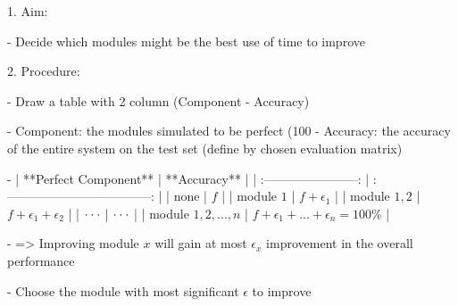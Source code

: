 1. Aim:

- Decide which modules might be the best use of time to improve

2. Procedure:

- Draw a table with 2 column (Component - Accuracy)

- Component: the modules simulated to be perfect (100%
- Accuracy: the accuracy of the entire system on the test set (define by chosen evaluation matrix)

- |   **Perfect Component**   |             **Accuracy**              |
| :-----------------------: | :-----------------------------------: |
|           none            |                  $f$                  |
|        module $1$         |            $f+\epsilon_1$             |
|       module $1,2$        |       $f+\epsilon_1+\epsilon_2$       |
| $\cdot \\ \cdot \\ \cdot$ |       $\cdot \\ \cdot \\ \cdot$       |
|    module $1,2,...,n$     | $f+\epsilon_1+...+\epsilon_n = 100\%$ |

- => Improving module $x$ will gain at most $\epsilon_x$ improvement in the overall performance

- Choose the module with most significant $\epsilon$ to improve









